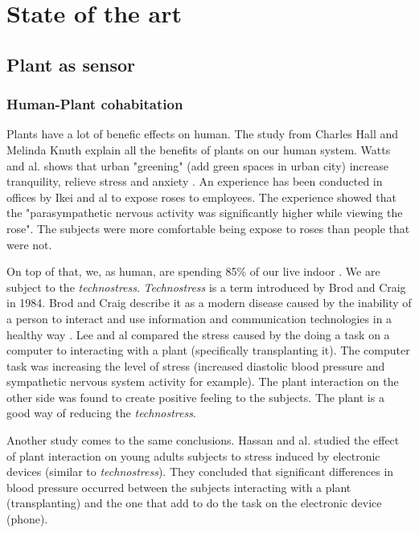 \section{State of the art}

\subsection{Plant as sensor}

\subsubsection{Human-Plant cohabitation}

Plants have a lot of benefic effects on human. The study from Charles Hall and Melinda Knuth \cite{hallUpdateLiteratureSupporting2019}
explain all the benefits of plants on our human system.
Watts and al. shows that urban "greening" (add green spaces in urban city)
increase tranquility, relieve stress and anxiety \cite{wattsEffectsGreeningUrban2017}.
An experience has been conducted in offices by Ikei and al \cite{ikeiPhysiologicalPsychologicalRelaxing2014}
to expose roses to employees. The experience showed that the "parasympathetic nervous activity was significantly higher while viewing the rose". 
The subjects were more comfortable
being expose to roses than people that were not.

On top of that, we, as human, are spending 85\% of our live indoor \cite{leeInteractionIndoorPlants2015}. We are subject to the
\textit{technostress}. \textit{Technostress} is a term introduced by Brod and Craig \cite{brod1984technostress} in 1984.
Brod and Craig describe it as a modern disease caused by the inability of a person to interact and use information and communication technologies
in a healthy way \cite{ayyagariTechnostressTechnologicalAntecedents2011}. Lee and al \cite{leeInteractionIndoorPlants2015} compared 
the stress caused by the doing a task on a computer to interacting with a plant (specifically transplanting it).
The computer task was increasing the level of stress (increased diastolic blood pressure and sympathetic nervous system activity for example).
The plant interaction on the other side was found to create positive feeling to the subjects. The plant is a good way of reducing
the \textit{technostress}.

Another study comes to the same conclusions. Hassan and al. \cite{hassanEffectsPlantActivity2018}
studied the effect of plant interaction on young adults subjects to 
stress induced by electronic devices (similar to \textit{technostress}).
They concluded that significant differences in blood pressure occurred
between the subjects interacting with a plant (transplanting) and the 
one that add to do the task on the electronic device (phone).

